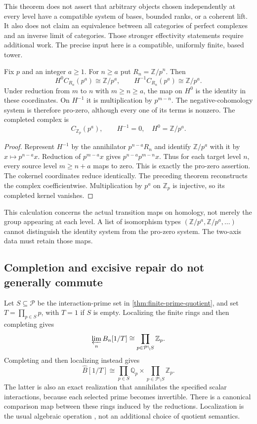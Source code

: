 This theorem does not assert that arbitrary objects chosen independently at every level have a compatible system of bases, bounded ranks, or a coherent lift. It also does not claim an equivalence between all categories of perfect complexes and an inverse limit of categories. Those stronger effectivity statements require additional work. The precise input here is a compatible, uniformly finite, based tower.

\begin{proposition}\label{prop:transient-koszul}
Fix $p$ and an integer $a\geq1$. For $n\geq a$ put $R_n=\mathbb Z/p^n$. Then
\[
 H^0C_{R_n}(p^a)\cong\mathbb Z/p^a,
 \qquad H^{-1}C_{R_n}(p^a)\cong\mathbb Z/p^a.
\]
Under reduction from $m$ to $n$ with $m\geq n\geq a$, the map on $H^0$ is the identity in these coordinates. On $H^{-1}$ it is multiplication by $p^{m-n}$. The negative-cohomology system is therefore pro-zero, although every one of its terms is nonzero. The completed complex is
\[
 C_{\mathbb Z_p}(p^a),\qquad
 H^{-1}=0,\quad H^0=\mathbb Z/p^a.
\]
\end{proposition}
\begin{proof}
Represent $H^{-1}$ by the annihilator $p^{n-a}R_n$ and identify $\mathbb Z/p^a$ with it by $x\mapsto p^{n-a}x$. Reduction of $p^{m-a}x$ gives $p^{n-a}p^{m-n}x$. Thus for each target level $n$, every source level $m\geq n+a$ maps to zero. This is exactly the pro-zero assertion. The cokernel coordinates reduce identically. The preceding theorem reconstructs the complex coefficientwise. Multiplication by $p^a$ on $\mathbb Z_p$ is injective, so its completed kernel vanishes.
\end{proof}

This calculation concerns the actual transition maps on homology, not merely the group appearing at each level. A list of isomorphism types $(\mathbb Z/p^a,\mathbb Z/p^a,\ldots)$ cannot distinguish the identity system from the pro-zero system. The two-axis data must retain those maps.

\subsection{Completion and excisive repair do not generally commute}

Let $S\subseteq\mathcal P$ be the interaction-prime set in \cref{thm:finite-prime-quotient}, and set $T=\prod_{p\in S}p$, with $T=1$ if $S$ is empty. Localizing the finite rings and then completing gives
\[
 \varprojlim_n B_n[1/T]\cong\prod_{p\in\mathcal P\setminus S}\mathbb Z_p.
\]
Completing and then localizing instead gives
\[
 \widehat B[1/T]\cong
 \prod_{p\in S}\mathbb Q_p\times
 \prod_{p\in\mathcal P\setminus S}\mathbb Z_p.
\]
The latter is also an exact realization that annihilates the specified scalar interactions, because each selected prime becomes invertible. There is a canonical comparison map between these rings induced by the reductions. Localization is the usual algebraic operation \cite{StacksLocalization}, not an additional choice of quotient semantics.

